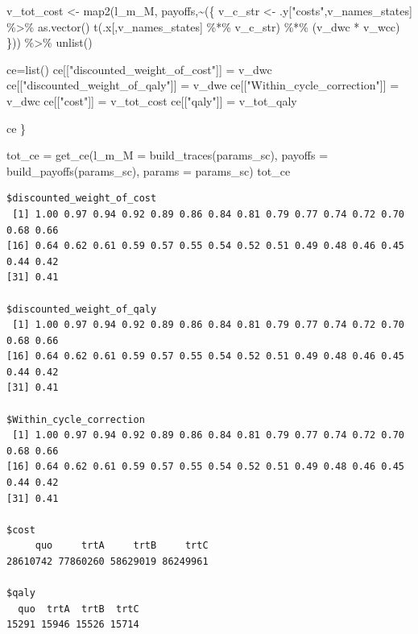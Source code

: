 \documentclass[
  letterpaper,
  DIV=11,
  numbers=noendperiod,
  oneside]{scrartcl}
\newenvironment{Shaded}{\begin{snugshade}}{\end{snugshade}}
\newcommand{\AttributeTok}[1]{\textcolor[rgb]{0.40,0.45,0.13}{#1}}
\newcommand{\FunctionTok}[1]{\textcolor[rgb]{0.28,0.35,0.67}{#1}}
\newcommand{\NormalTok}[1]{\textcolor[rgb]{0.00,0.23,0.31}{#1}}
\newcommand{\OtherTok}[1]{\textcolor[rgb]{0.00,0.23,0.31}{#1}}
\newcommand{\SpecialCharTok}[1]{\textcolor[rgb]{0.37,0.37,0.37}{#1}}
\newcommand{\StringTok}[1]{\textcolor[rgb]{0.13,0.47,0.30}{#1}}
\begin{document}
\begin{Shaded}
\begin{Highlighting}[]
\NormalTok{  v\_tot\_cost }\OtherTok{\textless{}{-}}
    \FunctionTok{map2}\NormalTok{(l\_m\_M, payoffs,}\SpecialCharTok{\textasciitilde{}}\NormalTok{(\{}
\NormalTok{      v\_c\_str }\OtherTok{\textless{}{-}}\NormalTok{ .y[}\StringTok{"costs"}\NormalTok{,v\_names\_states] }\SpecialCharTok{\%\textgreater{}\%} \FunctionTok{as.vector}\NormalTok{()}
      \FunctionTok{t}\NormalTok{(.x[,v\_names\_states] }\SpecialCharTok{\%*\%}\NormalTok{ v\_c\_str) }\SpecialCharTok{\%*\%}\NormalTok{ (v\_dwc }\SpecialCharTok{*}\NormalTok{ v\_wcc)}
\NormalTok{    \})) }\SpecialCharTok{\%\textgreater{}\%}
    \FunctionTok{unlist}\NormalTok{()}
  
\NormalTok{  ce}\OtherTok{=}\FunctionTok{list}\NormalTok{()}
\NormalTok{  ce[[}\StringTok{"discounted\_weight\_of\_cost"}\NormalTok{]] }\OtherTok{=}\NormalTok{ v\_dwc}
\NormalTok{  ce[[}\StringTok{"discounted\_weight\_of\_qaly"}\NormalTok{]] }\OtherTok{=}\NormalTok{ v\_dwe}
\NormalTok{  ce[[}\StringTok{"Within\_cycle\_correction"}\NormalTok{]] }\OtherTok{=}\NormalTok{ v\_dwc}
\NormalTok{  ce[[}\StringTok{"cost"}\NormalTok{]] }\OtherTok{=}\NormalTok{ v\_tot\_cost}
\NormalTok{  ce[[}\StringTok{"qaly"}\NormalTok{]] }\OtherTok{=}\NormalTok{ v\_tot\_qaly}
  
\NormalTok{  ce}
\NormalTok{\}}

\NormalTok{tot\_ce }\OtherTok{=} \FunctionTok{get\_ce}\NormalTok{(}\AttributeTok{l\_m\_M =} \FunctionTok{build\_traces}\NormalTok{(params\_sc), }\AttributeTok{payoffs =} \FunctionTok{build\_payoffs}\NormalTok{(params\_sc), }\AttributeTok{params =}\NormalTok{ params\_sc)}
\NormalTok{tot\_ce}
\end{Highlighting}
\end{Shaded}

\begin{verbatim}
$discounted_weight_of_cost
 [1] 1.00 0.97 0.94 0.92 0.89 0.86 0.84 0.81 0.79 0.77 0.74 0.72 0.70 0.68 0.66
[16] 0.64 0.62 0.61 0.59 0.57 0.55 0.54 0.52 0.51 0.49 0.48 0.46 0.45 0.44 0.42
[31] 0.41

$discounted_weight_of_qaly
 [1] 1.00 0.97 0.94 0.92 0.89 0.86 0.84 0.81 0.79 0.77 0.74 0.72 0.70 0.68 0.66
[16] 0.64 0.62 0.61 0.59 0.57 0.55 0.54 0.52 0.51 0.49 0.48 0.46 0.45 0.44 0.42
[31] 0.41

$Within_cycle_correction
 [1] 1.00 0.97 0.94 0.92 0.89 0.86 0.84 0.81 0.79 0.77 0.74 0.72 0.70 0.68 0.66
[16] 0.64 0.62 0.61 0.59 0.57 0.55 0.54 0.52 0.51 0.49 0.48 0.46 0.45 0.44 0.42
[31] 0.41

$cost
     quo     trtA     trtB     trtC 
28610742 77860260 58629019 86249961 

$qaly
  quo  trtA  trtB  trtC 
15291 15946 15526 15714 
\end{verbatim}
\end{document}
